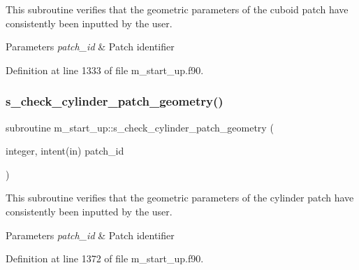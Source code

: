 This subroutine verifies that the geometric parameters of the cuboid patch have consistently been inputted by the user. 


\begin{DoxyParams}{Parameters}
{\em patch\+\_\+id} & Patch identifier \\
\hline
\end{DoxyParams}


Definition at line 1333 of file m\+\_\+start\+\_\+up.\+f90.

\mbox{\label{namespacem__start__up_ad6c503541113565dcac0b49b11ff3afb}} 
\subsubsection{\texorpdfstring{s\+\_\+check\+\_\+cylinder\+\_\+patch\+\_\+geometry()}{s\_check\_cylinder\_patch\_geometry()}}
{\footnotesize\ttfamily subroutine m\+\_\+start\+\_\+up\+::s\+\_\+check\+\_\+cylinder\+\_\+patch\+\_\+geometry (\begin{DoxyParamCaption}\item[{integer, intent(in)}]{patch\+\_\+id }\end{DoxyParamCaption})}



This subroutine verifies that the geometric parameters of the cylinder patch have consistently been inputted by the user. 


\begin{DoxyParams}{Parameters}
{\em patch\+\_\+id} & Patch identifier \\
\hline
\end{DoxyParams}


Definition at line 1372 of file m\+\_\+start\+\_\+up.\+f90.

\mbox{\label{namespacem__start__up_a51ddc16cb3379a50fbf2957e47dbb7d5}} 
